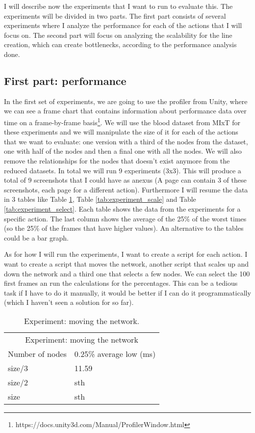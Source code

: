 I will describe now the experiments that I want to run to evaluate this. The experiments will be divided in two parts. The first part consists of several experiments where I analyze the performance for each of the actions that I will focus on. The second part will focus on analyzing the scalability for the line creation, which can create bottlenecks, according to the performance analysis done.

\subsection{First part: performance}

In the first set of experiments, we are going to use the profiler from Unity, where we can see a frame chart that contains information about performance data over time on a frame-by-frame basis\footnote{https://docs.unity3d.com/Manual/ProfilerWindow.html}. We will use the blood dataset from MIxT for these experiments and we will manipulate the size of it for each of the actions that we want to evaluate: one version with a third of the nodes from the dataset, one with half of the nodes and then a final one with all the nodes. We will also remove the relationships for the nodes that doesn't exist anymore from the reduced datasets. In total we will run 9 experiments (3x3). This will produce a total of 9 screenshots that I could have as anexus (A page can contain 3 of these screenshots, each page for a different action). Furthermore I will resume the data in 3 tables like Table \ref{tab:experiment_moving}, Table \ref{tab:experiment_scale} and Table \ref{tab:experiment_select}. Each table shows the data from the experiments for a specific action. The last column shows the average of the 25\% of the worst times (so the 25\% of the frames that have higher values). An alternative to the tables could be a bar graph.

As for how I will run the experiments, I want to create a script for each action. I want to create a script that moves the network, another script that scales up and down the network and a third one that selects a few nodes. We can select the 100 first frames an run the calculations for the percentages. This can be a tedious task if I have to do it manually, it would be better if I can do it programmatically (which I haven't seen a solution for so far).

\begin{table}[h!]
\centering
\begin{tabular}{ll}
\multicolumn{2}{c}{Experiment: moving the network} \\
Number of nodes   & 0.25\% average low (ms) \\
size/3 & 11.59 \\
size/2 & sth \\
size & sth \\
\end{tabular}
\caption{Experiment: moving the network.}
\label{tab:experiment_moving}
\end{table}

